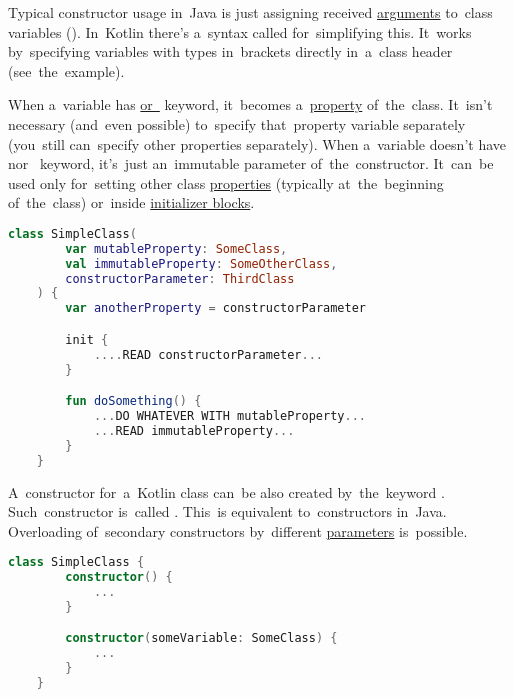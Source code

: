 \label{kotlinconstructor}
\label{kotlinprimaryconstructor}
Typical constructor usage in~Java is just assigning received \hyperref[parameterargument]{arguments} to~class variables ().
In~Kotlin there's a~syntax called  for~simplifying this.
It~works by~specifying variables with types in~brackets directly in~a~class header (see~the~example).

When a~variable has \hyperref[kotlinvalvar]{ \mbox{or }} keyword, it~becomes \mbox{a \hyperref[variablefieldproperty]{property}} of~the~class.
It~isn't necessary (and~even possible) to~specify that~property variable separately (you~still can~specify other properties separately).
When a~variable doesn't have  \mbox{nor } keyword, it's~just an~immutable parameter of~the~constructor.
It~can~be used only for~setting other class \hyperref[variablefieldproperty]{properties} (typically at~the~beginning of~the~class) or~inside \hyperref[kotlininitblock]{initializer blocks}.

\begin{lstlisting}[language=Kotlin]
    class SimpleClass(
        var mutableProperty: SomeClass,
        val immutableProperty: SomeOtherClass,
        constructorParameter: ThirdClass
    ) {
        var anotherProperty = constructorParameter

        init {
            ....READ constructorParameter...
        }

        fun doSomething() {
            ...DO WHATEVER WITH mutableProperty...
            ...READ immutableProperty...
        }
    }
\end{lstlisting}
\newpage

\label{kotlinsecondaryconstructor}
A~constructor for~a~Kotlin class can~be also created by~the~keyword .
Such~constructor is~called .
This~is equivalent to~constructors in~Java.
Overloading of~secondary constructors by~different \hyperref[parameterargument]{parameters} is~possible.

\begin{lstlisting}[language=Kotlin]
    class SimpleClass {
        constructor() {
            ...
        }

        constructor(someVariable: SomeClass) {
            ...
        }
    }
\end{lstlisting}

